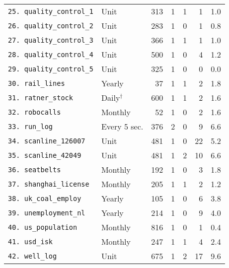 \begin{tabular}{llrrrrr}
\verb+25. quality_control_1+ & Unit & 313 & 1 & 1 & 1 & 1.0 \\
\verb+26. quality_control_2+ & Unit & 283 & 1 & 0 & 1 & 0.8 \\
\verb+27. quality_control_3+ & Unit & 366 & 1 & 1 & 1 & 1.0 \\
\verb+28. quality_control_4+ & Unit & 500 & 1 & 0 & 4 & 1.2 \\
\verb+29. quality_control_5+ & Unit & 325 & 1 & 0 & 0 & 0.0 \\
\verb+30. rail_lines+ & Yearly & 37 & 1 & 1 & 2 & 1.8 \\
\verb+31. ratner_stock+ & Daily$^{\dagger}$ & 600 & 1 & 1 & 2 & 1.6 \\
\verb+32. robocalls+ & Monthly & 52 & 1 & 0 & 2 & 1.6 \\
\verb+33. run_log+ & Every 5 sec. & 376 & 2 & 0 & 9 & 6.6 \\
\verb+34. scanline_126007+ & Unit & 481 & 1 & 0 & 22 & 5.2 \\
\verb+35. scanline_42049+ & Unit & 481 & 1 & 2 & 10 & 6.6 \\
\verb+36. seatbelts+ & Monthly & 192 & 1 & 0 & 3 & 1.8 \\
\verb+37. shanghai_license+ & Monthly & 205 & 1 & 1 & 2 & 1.2 \\
\verb+38. uk_coal_employ+ & Yearly & 105 & 1 & 0 & 6 & 3.8 \\
\verb+39. unemployment_nl+ & Yearly & 214 & 1 & 0 & 9 & 4.0 \\
\verb+40. us_population+ & Monthly & 816 & 1 & 0 & 1 & 0.4 \\
\verb+41. usd_isk+ & Monthly & 247 & 1 & 1 & 4 & 2.4 \\
\verb+42. well_log+ & Unit & 675 & 1 & 2 & 17 & 9.6 \\
\bottomrule
\end{tabular}